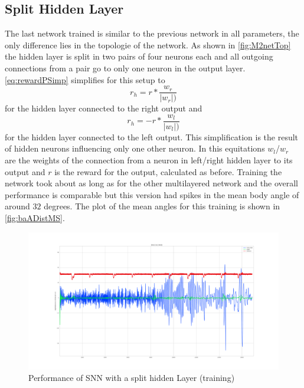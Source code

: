 \subsection{Split Hidden Layer}
The last network trained is similar to the previous network in all parameters, the only difference lies in the topologie of the network. As shown in \autoref{fig:M2netTop} the hidden layer is split in two pairs of four neurons each and all outgoing connections from a pair go to only one neuron in the output layer. \autoref{eq:rewardPSimp} simplifies for this setup to
\begin{equation}
r_h = r * \frac{w_r} {|w_r|)}
\end{equation}
for the hidden layer connected to the right output and
\begin{equation}
r_h = - r * \frac{w_l} {|w_l|)}
\end{equation}
for the hidden layer connected to the left output. This simplification is the result of hidden neurons influencing only one other neuron. In this equitations $w_l$/$w_r$ are the weights of the connection from a neuron in left/right hidden layer to its output and $r$ is the reward for the output, calculated as before.
Training the network took about as long as for the other multilayered network and the overall performance is comparable but this version had spikes in the mean body angle of around $32$ degrees. The plot of the mean angles for this training is shown in \autoref{fig:baADistMS}.
\begin{figure}[htpb]
  \centering
  \includegraphics[width=\textwidth]{figures/plots/baADistMS}
  \caption{ Performance of SNN with a split hidden Layer (training)  }
  \label{fig:baADistMS}
\end{figure}
